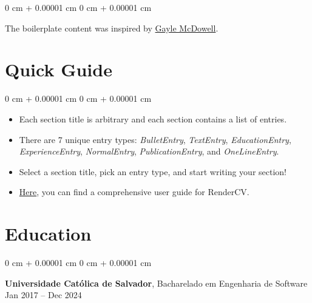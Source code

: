 \documentclass[10pt, letterpaper]{article}
\newenvironment{highlightsforbulletentries}{
    \begin{itemize}[
        topsep=0.10 cm,
        parsep=0.10 cm,
        partopsep=0pt,
        itemsep=0pt,
        leftmargin=10pt
    ]
}{
    \end{itemize}
} %
\newenvironment{onecolentry}{
    \begin{adjustwidth}{
        0 cm + 0.00001 cm
    }{
        0 cm + 0.00001 cm
    }
}{
    \end{adjustwidth}
} %
\newenvironment{twocolentry}[2][]{
    \onecolentry
    \def\secondColumn{#2}
    \setcolumnwidth{\fill, 4.5 cm}
    \begin{paracol}{2}
}{
    \switchcolumn \raggedleft \secondColumn
    \end{paracol}
    \endonecolentry
} %
\begin{document}
        \vspace{0.2 cm}

        \begin{onecolentry}
            The boilerplate content was inspired by \href{https://github.com/dnl-blkv/mcdowell-cv}{Gayle McDowell}.
        \end{onecolentry}


    
    \section{Quick Guide}

    \begin{onecolentry}
        \begin{highlightsforbulletentries}


        \item Each section title is arbitrary and each section contains a list of entries.

        \item There are 7 unique entry types: \textit{BulletEntry}, \textit{TextEntry}, \textit{EducationEntry}, \textit{ExperienceEntry}, \textit{NormalEntry}, \textit{PublicationEntry}, and \textit{OneLineEntry}.

        \item Select a section title, pick an entry type, and start writing your section!

        \item \href{https://docs.rendercv.com/user_guide/}{Here}, you can find a comprehensive user guide for RenderCV.


        \end{highlightsforbulletentries}
    \end{onecolentry}

    \section{Education}



        
        \begin{twocolentry}{
            Jan 2017 – Dec 2024
        }
            \textbf{Universidade Católica de Salvador}, Bacharelado em Engenharia de Software\end{twocolentry}
\end{document}
